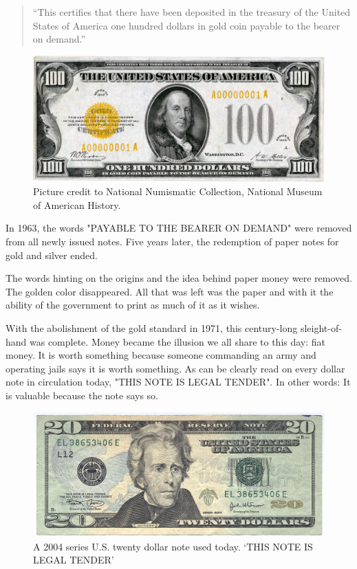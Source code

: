 \begin{quotation}
``This certifies that there have been deposited in the treasury of the
United States of America one hundred dollars in gold coin payable to
the bearer on demand.''
\end{quotation}

\begin{figure}
  \centering
  \includegraphics{assets/images/us-gold-cert-100-smaller.png}
  \caption{Picture credit to National Numismatic Collection, National Museum of American History.}
  \label{fig:us-gold-cert-100-smaller}
\end{figure}

In 1963, the words "PAYABLE TO THE BEARER ON DEMAND" were removed from
all newly issued notes. Five years later, the redemption of paper notes
for gold and silver ended.

The words hinting on the origins and the idea behind paper money were
removed. The golden color disappeared. All that was left was the paper
and with it the ability of the government to print as much of it as it
wishes.

With the abolishment of the gold standard in 1971, this century-long
sleight-of-hand was complete. Money became the illusion we all share to
this day: fiat money. It is worth something because someone commanding
an army and operating jails says it is worth something. As can be
clearly read on every dollar note in circulation today, "THIS NOTE IS
LEGAL TENDER". In other words: It is valuable because the note says so.

\begin{figure}
  \centering
  \includegraphics{assets/images/us-dollar-2004.jpg}
  \caption{A 2004 series U.S. twenty dollar note used today. `THIS NOTE IS LEGAL TENDER'}
  \label{fig:us-dollar-2004}
\end{figure}

